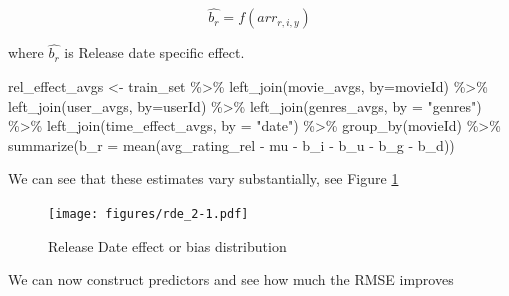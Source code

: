\documentclass[
]{article}
\newenvironment{Shaded}{}{}
\newcommand{\AttributeTok}[1]{\textcolor[rgb]{0.49,0.56,0.16}{#1}}
\newcommand{\FunctionTok}[1]{\textcolor[rgb]{0.02,0.16,0.49}{#1}}
\newcommand{\NormalTok}[1]{#1}
\newcommand{\OtherTok}[1]{\textcolor[rgb]{0.00,0.44,0.13}{#1}}
\newcommand{\SpecialCharTok}[1]{\textcolor[rgb]{0.25,0.44,0.63}{#1}}
\newcommand{\StringTok}[1]{\textcolor[rgb]{0.25,0.44,0.63}{#1}}
\begin{document}
\label{eq:EqModel6-4} \begin{equation}
  \hat{b_{r}} = f(arr_{r,i,y})
\end{equation}

where \(\hat{b_{r}}\) is Release date specific effect.

\begin{Shaded}
\begin{Highlighting}[]
\NormalTok{rel\_effect\_avgs }\OtherTok{\textless{}{-}}\NormalTok{ train\_set }\SpecialCharTok{\%\textgreater{}\%}
  \FunctionTok{left\_join}\NormalTok{(movie\_avgs, }\AttributeTok{by=}\StringTok{\textquotesingle{}movieId\textquotesingle{}}\NormalTok{) }\SpecialCharTok{\%\textgreater{}\%}
  \FunctionTok{left\_join}\NormalTok{(user\_avgs, }\AttributeTok{by=}\StringTok{\textquotesingle{}userId\textquotesingle{}}\NormalTok{) }\SpecialCharTok{\%\textgreater{}\%} 
  \FunctionTok{left\_join}\NormalTok{(genres\_avgs, }\AttributeTok{by =} \StringTok{"genres"}\NormalTok{) }\SpecialCharTok{\%\textgreater{}\%} 
  \FunctionTok{left\_join}\NormalTok{(time\_effect\_avgs, }\AttributeTok{by =} \StringTok{"date"}\NormalTok{) }\SpecialCharTok{\%\textgreater{}\%} 
  \FunctionTok{group\_by}\NormalTok{(movieId) }\SpecialCharTok{\%\textgreater{}\%} 
  \FunctionTok{summarize}\NormalTok{(}\AttributeTok{b\_r =} \FunctionTok{mean}\NormalTok{(avg\_rating\_rel }\SpecialCharTok{{-}}\NormalTok{ mu }\SpecialCharTok{{-}}\NormalTok{ b\_i }\SpecialCharTok{{-}}\NormalTok{ b\_u }\SpecialCharTok{{-}}\NormalTok{ b\_g }\SpecialCharTok{{-}}\NormalTok{ b\_d))}
\end{Highlighting}
\end{Shaded}

\newpage

We can see that these estimates vary substantially, see Figure
\ref{fig:model_6}

\begin{figure}
\centering
\texttt{[image: figures/rde\_2-1.pdf]}
\caption{Release Date effect or bias distribution\label{fig:model_6}}
\end{figure}

We can now construct predictors and see how much the RMSE improves
\end{document}
